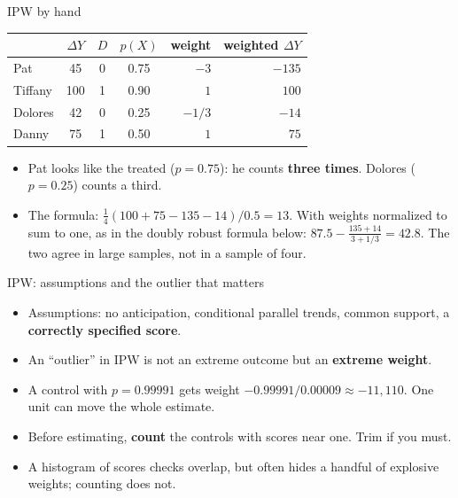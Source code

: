 \documentclass[
  11pt,
  ignorenonframetext,
  aspectratio=169,
]{beamer}
\providecommand{\tightlist}{%
  \setlength{\itemsep}{0pt}\setlength{\parskip}{0pt}}
\begin{document}
\begin{frame}{IPW by hand}
\protect{}\label{ipw-by-hand}
\begin{center}\small
\begin{tabular}{lcccrr}
\toprule
 & $\Delta Y$ & $D$ & $p(X)$ & weight & weighted $\Delta Y$ \\
\midrule
Pat & 45 & 0 & 0.75 & $-3$ & $-135$ \\
Tiffany & 100 & 1 & 0.90 & $1$ & $100$ \\
Dolores & 42 & 0 & 0.25 & $-1/3$ & $-14$ \\
Danny & 75 & 1 & 0.50 & $1$ & $75$ \\
\bottomrule
\end{tabular}
\end{center}

\begin{itemize}
\tightlist
\item
  Pat looks like the treated (\(p = 0.75\)): he counts \textbf{three
  times}. Dolores (\(p = 0.25\)) counts a third.
\item
  The formula: \(\tfrac14(100 + 75 - 135 - 14) / 0.5 = 13\). With
  weights normalized to sum to one, as in the doubly robust formula
  below: \(87.5 - \tfrac{135 + 14}{3 + 1/3} = 42.8\). The two agree in
  large samples, not in a sample of four.
\end{itemize}
\end{frame}

\begin{frame}{IPW: assumptions and the outlier that matters}
\protect{}\label{ipw-assumptions-and-the-outlier-that-matters}
\begin{itemize}
\tightlist
\item
  Assumptions: no anticipation, conditional parallel trends, common
  support, a \textbf{correctly specified score}.
\item
  An ``outlier'' in IPW is not an extreme outcome but an \textbf{extreme
  weight}.
\item
  A control with \(p = 0.99991\) gets weight
  \(-0.99991/0.00009 \approx -11{,}110\). One unit can move the whole
  estimate.
\item
  Before estimating, \textbf{count} the controls with scores near one.
  Trim if you must.
\item
  A histogram of scores checks overlap, but often hides a handful of
  explosive weights; counting does not.
\end{itemize}
\end{frame}
\end{document}

